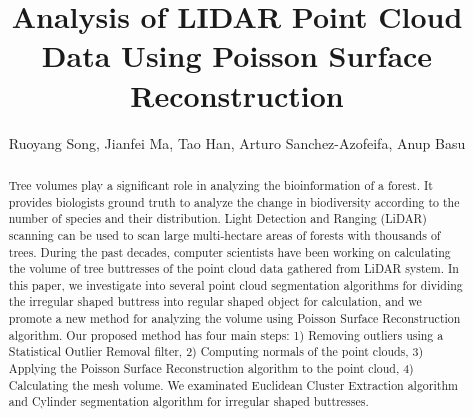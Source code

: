 \documentclass[runningheads,a4paper]{llncs}
\begin{document}

\title{Analysis of LIDAR Point Cloud Data Using Poisson Surface Reconstruction}


%
%
\author{Ruoyang Song, Jianfei Ma, Tao Han, Arturo Sanchez-Azofeifa, Anup Basu}



%
%

\maketitle


\begin{abstract}
Tree volumes play a significant role in analyzing the bioinformation of a forest. It provides biologists ground truth to analyze the change in biodiversity according to the number of species and their distribution. Light Detection and Ranging (LiDAR) scanning can be used to scan large multi-hectare areas of forests with thousands of trees. During the past decades, computer scientists have been working on calculating the volume of tree buttresses of the point cloud data gathered from LiDAR system. In this paper, we investigate into several point cloud segmentation algorithms for dividing the irregular shaped buttress into regular shaped object for calculation, and we promote a new method for analyzing the volume using Poisson Surface Reconstruction algorithm.  Our proposed method has four main steps: 1) Removing outliers using a Statistical Outlier Removal filter, 2) Computing normals of the point clouds, 3) Applying the Poisson Surface Reconstruction algorithm to the point cloud, 4) Calculating the mesh volume. We examinated Euclidean Cluster Extraction algorithm and Cylinder segmentation algorithm for irregular shaped buttresses.
\end{abstract}
\end{document}
